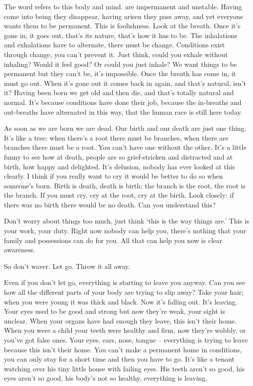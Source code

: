 The word  refers to this body and mind.  are impermanent and unstable. Having come into being they disappear, having arisen they pass away, and yet everyone wants them to be permanent. This is foolishness. Look at the breath. Once it's gone in, it goes out, that's its nature, that's how it has to be. The inhalations and exhalations have to alternate, there must be change. Conditions exist through change, you can't prevent it. Just think, could you exhale without inhaling? Would it feel good? Or could you just inhale? We want things to be permanent but they can't be, it's impossible. Once the breath has come in, it must go out. When it's gone out it comes back in again, and that's natural, isn't it? Having been born we get old and then die, and that's totally natural and normal. It's because conditions have done their job, because the in-breaths and out-breaths have alternated in this way, that the human race is still here today.

As soon as we are born we are dead. Our birth and our death are just one thing. It's like a tree: when there's a root there must be branches, when there are branches there must be a root. You can't have one without the other. It's a little funny to see how at death, people are so grief-stricken and distracted and at birth, how happy and delighted. It's delusion, nobody has ever looked at this clearly. I think if you really want to cry it would be better to do so when someone's born. Birth is death, death is birth; the branch is the root, the root is the branch. If you must cry, cry at the root, cry at the birth. Look closely: if there was no birth there would be no death. Can you understand this?

Don't worry about things too much, just think `this is the way things are.' This is your work, your duty. Right now nobody can help you, there's nothing that your family and possessions can do for you. All that can help you now is clear awareness.

So don't waver. Let go. Throw it all away.

Even if you don't let go, everything is starting to leave you anyway. Can you see how all the different parts of your body are trying to slip away? Take your hair; when you were young it was thick and black. Now it's falling out. It's leaving. Your eyes used to be good and strong but now they're weak, your sight is unclear. When your organs have had enough they leave, this isn't their home. When you were a child your teeth were healthy and firm, now they're wobbly, or you've got false ones. Your eyes, ears, nose, tongue -- everything is trying to leave because this isn't their home. You can't make a permanent home in conditions, you can only stay for a short time and then you have to go. It's like a tenant watching over his tiny little house with failing eyes. His teeth aren't so good, his eyes aren't so good, his body's not so healthy, everything is leaving.

